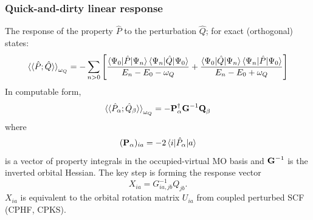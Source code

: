 \documentclass[xcolor=usenames,dvipsnames,svgnames]{beamer}
\begin{document}
\begin{frame}
  \frametitle{Quick-and-dirty linear response}
  The response of the property \(\hat{P}\) to the perturbation \(\hat{Q}\); for exact (orthogonal) states:
  \begin{equation*}
    \braket{\braket{\hat{P};\hat{Q}}}_{\omega_{Q}} = - \sum_{n>0} \left[ \frac{\braket{\Psi_{0}|\hat{P}|\Psi_{n}}\braket{\Psi_{n}|\hat{Q}|\Psi_{0}}}{E_{n} - E_{0} - \omega_{Q}} + \frac{\braket{\Psi_{0}|\hat{Q}|\Psi_{n}}\braket{\Psi_{n}|\hat{P}|\Psi_{0}}}{E_{n} - E_{0} + \omega_{Q}} \right]
  \end{equation*}
  In computable form,
  \begin{equation*}
    \braket{\braket{\hat{P}_{\alpha};\hat{Q}_{\beta}}}_{\omega_{Q}} = - \boldsymbol{\mathbf{P}}_{\alpha}^{\dagger} \boldsymbol{\mathbf{G}}^{-1} \boldsymbol{\mathbf{Q}}_{\beta}
  \end{equation*}
  where
  \begin{equation*}
    (\boldsymbol{\mathbf{P}}_{\alpha})_{ia} = -2 \braket{ i | \hat{P}_{\alpha} | a }
  \end{equation*}
  is a vector of property integrals in the occupied-virtual MO basis and \(\boldsymbol{\mathbf{G}}^{-1}\) is the inverted orbital Hessian. The key step is forming the response vector
  \begin{equation*}
    X_{ia} = G_{ia,jb}^{-1} Q_{jb}.
  \end{equation*}
  \(X_{ia}\) is equivalent to the orbital rotation matrix \(U_{ia}\) from coupled perturbed SCF (CPHF, CPKS).
\end{frame}
\end{document}
